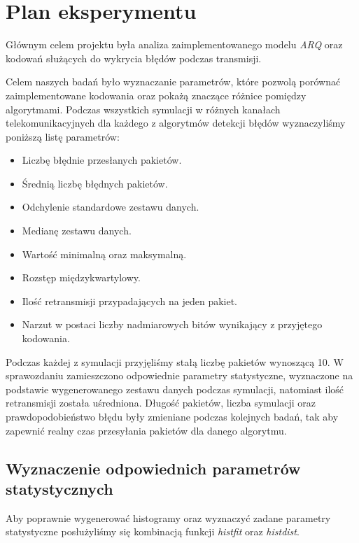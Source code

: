 \documentclass{article}
\begin{document}
\newpage

\section{Plan eksperymentu}

Głównym celem projektu była analiza zaimplementowanego modelu \textit{ARQ} oraz kodowań służących do wykrycia błędów podczas transmisji.

Celem naszych badań było wyznaczanie parametrów, które pozwolą porównać zaimplementowane kodowania oraz pokażą znaczące różnice pomiędzy algorytmami. Podczas wszystkich symulacji w różnych kanałach telekomunikacyjnych dla każdego z algorytmów detekcji błędów wyznaczyliśmy poniższą listę parametrów:

\begin{itemize}
    \item Liczbę błędnie przesłanych pakietów.
    \item Średnią liczbę błędnych pakietów.
    \item Odchylenie standardowe zestawu danych.
    \item Medianę zestawu danych.
    \item Wartość minimalną oraz maksymalną.
    \item Rozstęp międzykwartylowy.
    \item Ilość retransmisji przypadających na jeden pakiet.
    \item Narzut w postaci liczby nadmiarowych bitów wynikający z przyjętego kodowania.
\end{itemize}

Podczas każdej z symulacji przyjęliśmy stałą liczbę pakietów wynoszącą 10. W sprawozdaniu zamieszczono odpowiednie parametry statystyczne, wyznaczone na podstawie wygenerowanego zestawu danych podczas symulacji, natomiast ilość retransmisji została uśredniona. Długość pakietów, liczba symulacji oraz prawdopodobieństwo błędu były zmieniane podczas kolejnych badań, tak aby zapewnić realny czas przesyłania pakietów dla danego algorytmu.

\subsection{Wyznaczenie odpowiednich parametrów statystycznych}

Aby poprawnie wygenerować histogramy oraz wyznaczyć zadane parametry statystyczne posłużyliśmy się kombinacją funkcji \textit{histfit} oraz \textit{histdist}.
\end{document}
